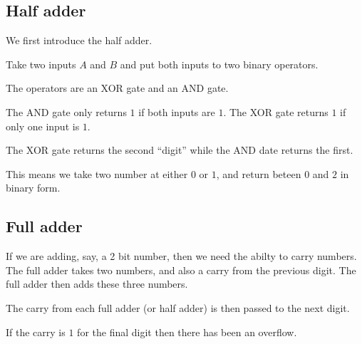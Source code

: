 
\subsection{Half adder}

We first introduce the half adder.

Take two inputs \(A\) and \(B\) and put both inputs to two binary operators.

The operators are an XOR gate and an AND gate.

The AND gate only returns \(1\) if both inputs are \(1\). The XOR gate returns \(1\) if only one input is \(1\).

The XOR gate returns the second “digit” while the AND date returns the first.

This means we take two number at either \(0\) or \(1\), and return beteen \(0\) and \(2\) in binary form.

\subsection{Full adder}

If we are adding, say, a 2 bit number, then we need the abilty to carry numbers. The full adder takes two numbers, and also a carry from the previous digit. The full adder then adds these three numbers.

The carry from each full adder (or half adder) is then passed to the next digit.

If the carry is \(1\) for the final digit then there has been an overflow.

